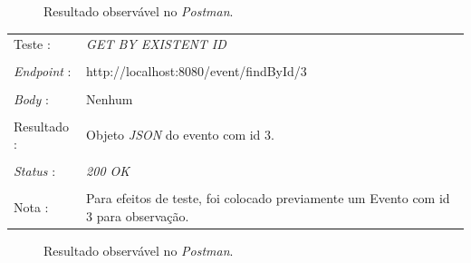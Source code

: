 \begin{figure}[h]
	\begin{center}
	\end{center}
	\caption{Resultado observável no \emph{Postman}.}\label{fig:eventall}
\end{figure}
\newpage
\begin{tabular}{ll}
	Teste : & \emph{GET BY EXISTENT ID }\\
	\\
	\emph{Endpoint} : & http://localhost:8080/event/findById/3\\
	\\
	\emph{Body} : & Nenhum\\
	\\
	Resultado : & Objeto \emph{JSON} do evento com id 3.\\
	\\
	\emph{Status} : & \emph{200 OK}\\
	\\
	Nota : & Para efeitos de teste, foi colocado previamente um Evento com id 3 para observação. \\
\end{tabular}

\begin{figure}[h]
	\begin{center}
	\end{center}
	\caption{Resultado observável no \emph{Postman}.}\label{fig:eventfindbyid200}
\end{figure}
\newpage


